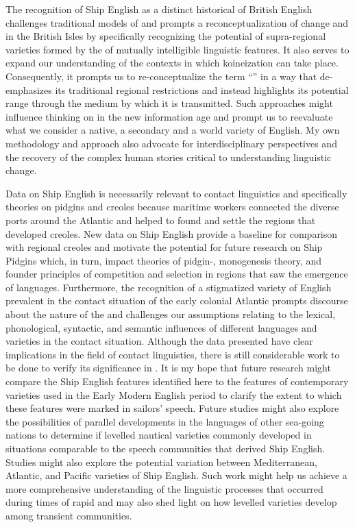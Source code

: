 The recognition of Ship English as a distinct historical  of British English challenges traditional models of  and prompts a reconceptualization of  change and  in the British Isles by specifically recognizing the potential of supra-regional varieties formed by the  of mutually intelligible linguistic features. It also serves to expand our understanding of the contexts in which koineization can take place. Consequently, it prompts us to re-conceptualize the term “” in a way that de-emphasizes its traditional regional restrictions and instead highlights its potential range through the medium by which it is transmitted. Such approaches might influence thinking on  in the new information age and prompt us to reevaluate what we consider a native, a secondary and a world variety of English. My own methodology and approach also advocate for interdisciplinary perspectives and the recovery of the complex human stories critical to understanding linguistic change. 

Data on Ship English is necessarily relevant to contact linguistics and specifically theories on pidgins and creoles because maritime workers connected the diverse ports around the Atlantic and helped to found and settle the regions that developed creoles. New data on Ship English provide a baseline for comparison with regional creoles and motivate the potential for future research on Ship Pidgins which, in turn, impact theories of pidgin-, monogenesis theory, and founder principles of competition and selection in regions that saw the emergence of  languages. Furthermore, the recognition of a stigmatized variety of English prevalent in the contact situation of the early colonial Atlantic prompts discourse about the nature of the  and challenges our assumptions relating to the lexical, phonological, syntactic, and semantic influences of different languages and varieties in the contact situation. Although the data presented have clear implications in the field of contact linguistics, there is still considerable work to be done to verify its significance in . It is my hope that future research might compare the Ship English features identified here to the features of contemporary varieties used in the Early Modern English period to clarify the extent to which these features were marked in sailors’ speech. Future studies might also explore the possibilities of parallel developments in the languages of other sea-going nations to determine if levelled nautical varieties commonly developed in situations comparable to the speech communities that derived Ship English. Studies might also explore the potential variation between Mediterranean, Atlantic, and Pacific varieties of Ship English. Such work might help us achieve a more comprehensive understanding of the linguistic processes that occurred during times of rapid  and may also shed light on how levelled varieties develop among transient communities.  


